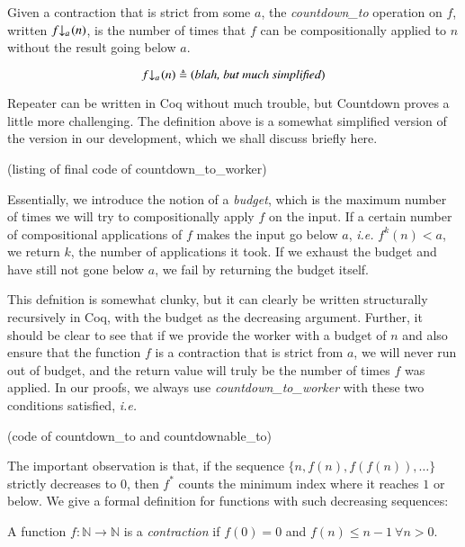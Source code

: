 \begin{defn} \label{defn: countdown}
Given a contraction that is strict from some $a$, 
the \textit{countdown\_to} operation on $f$, 
written $\cdt{f}{a}(n)$, is the number of times
that $f$ can be compositionally applied to $n$
without the result going below $a$. 

\begin{equation} \label{eq: countdown}
\cdt{f}{a}( n ) \triangleq (\textit{blah, but much simplified})
\end{equation}
\end{defn}

Repeater can be written in Coq without much trouble, but Countdown
proves a little more challenging. The definition above is a somewhat
simplified version of the version in our development, which we shall
discuss briefly here. 

{\color{red}(listing of final code of countdown\_to\_worker)}

Essentially, we introduce the notion of a \textit{budget}, which is 
the maximum number of times we will try to compositionally 
apply $f$ on the input. If a certain number of compositional applications 
of $f$ makes the input go below $a$, \emph{i.e.} $f^{k}(n) < a$, 
we return $k$, the number of applications it took. If we exhaust the 
budget and have still not gone below $a$, 
we fail by returning the budget itself.

This defnition is somewhat clunky, but it can clearly be written
structurally recursively in Coq, with the budget as the decreasing
argument. Further, it should be clear to see that 
if we provide the worker with a budget of $n$ and also ensure that the 
function $f$ is a contraction that is strict from $a$, we will 
never run out of budget, and the return value will truly be the 
number of times $f$ was applied. In our proofs, we always use 
\textit{countdown\_to\_worker} with these two conditions satisfied, 
\emph{i.e.}

{\color{red}(code of countdown\_to and countdownable\_to)


\iffalse
The important observation is that, if the sequence 
$\{n, f(n), f(f(n)), \ldots\}$ strictly decreases to 
$0$, then $f^*$ counts the minimum index where it reaches 
$1$ or below. We give a formal definition for functions 
with such decreasing sequences:}

\begin{defn} \label{defn: contraction}
A function $f: \mathbb{N} \to \mathbb{N}$ is a \textit{contraction} if $f(0) = 0$ and $f(n) \le n-1 \ \forall n > 0$.
\end{defn}


